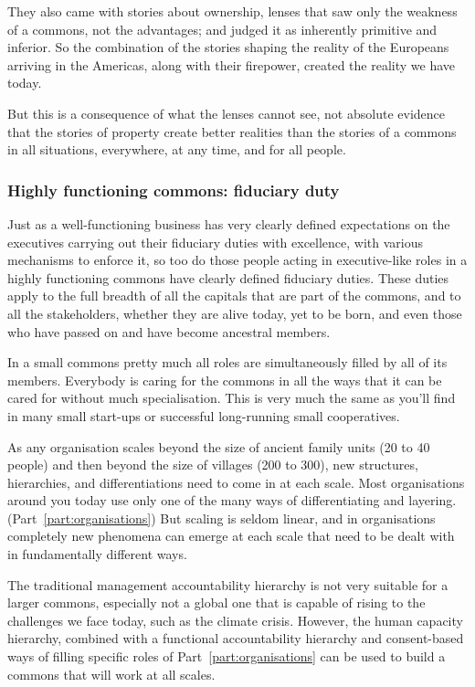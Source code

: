 They also came with stories about ownership, lenses that saw only the weakness of a commons, not the advantages; and judged it as inherently primitive and inferior. So the combination of the stories shaping the reality of the Europeans arriving in the Americas, along with their firepower, created the reality we have today. 


But this is a consequence of what the lenses cannot see, not absolute evidence that the stories of property create better realities than the stories of a commons in all situations, everywhere, at any time, and for all people.


\subsubsection{Highly functioning commons: fiduciary duty}
Just as a well-functioning business has very clearly defined expectations on the executives carrying out their fiduciary duties with excellence, with various mechanisms to enforce it, so too do those people acting in executive-like roles in a highly functioning commons have clearly defined fiduciary duties. These duties apply to the full breadth of all the capitals that are part of the commons, and to all the stakeholders, whether they are alive today, yet to be born, and even those who have passed on and have become ancestral members.


In a small commons pretty much all roles are simultaneously filled by all of its members. Everybody is caring for the commons in all the ways that it can be cared for without much specialisation. This is very much the same as you'll find in many small start-ups or successful long-running small cooperatives.


As any organisation scales beyond the size of ancient family units (20 to 40 people) and then beyond the size of villages (200 to 300), new structures, hierarchies, and differentiations need to come in at each scale. Most organisations around you today use only one of the many ways of differentiating and layering. (Part~\ref{part:organisations}) But scaling is seldom linear, and in organisations completely new phenomena can emerge at each scale that need to be dealt with in fundamentally different ways\cite{west-scale}. 


The traditional management accountability hierarchy is not very suitable for a larger commons, especially not a global one that is capable of rising to the challenges we face today, such as the climate crisis. However, the human capacity hierarchy, combined with a functional accountability hierarchy and consent-based ways of filling specific roles of Part~\ref{part:organisations} can be used to build a commons that will work at all scales.
